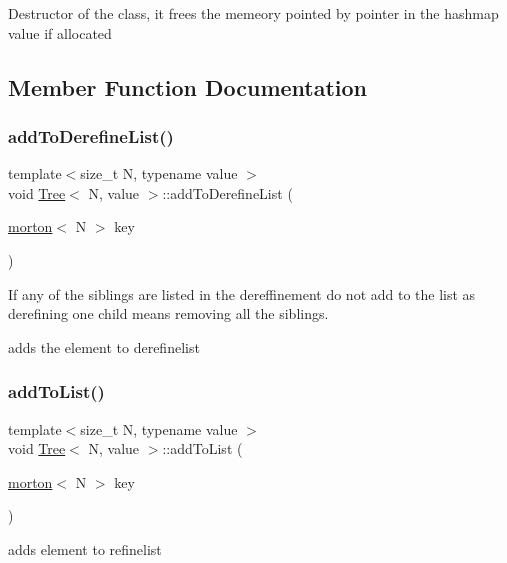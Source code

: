 Destructor of the class, it frees the memeory pointed by pointer in the hashmap value if allocated 

\subsection{Member Function Documentation}
\mbox{\label{classTree_a4527b5986587bad066e10ea733c1bc95}} 
\subsubsection{\texorpdfstring{add\+To\+Derefine\+List()}{addToDerefineList()}}
{\footnotesize\ttfamily template$<$size\+\_\+t N, typename value $>$ \\
void \mbox{\hyperlink{classTree}{Tree}}$<$ N, value $>$\+::add\+To\+Derefine\+List (\begin{DoxyParamCaption}\item[{\mbox{\hyperlink{definitions_8h_af8682350bd8bb38ee9023f7a0a310add}{morton}}$<$ N $>$}]{key }\end{DoxyParamCaption})}



If any of the siblings are listed in the dereffinement do not add to the list as derefining one child means removing all the siblings. 

adds the element to derefinelist \mbox{\label{classTree_a87d766216a59c8c77207f0fa2d093676}} 
\subsubsection{\texorpdfstring{add\+To\+List()}{addToList()}}
{\footnotesize\ttfamily template$<$size\+\_\+t N, typename value $>$ \\
void \mbox{\hyperlink{classTree}{Tree}}$<$ N, value $>$\+::add\+To\+List (\begin{DoxyParamCaption}\item[{\mbox{\hyperlink{definitions_8h_af8682350bd8bb38ee9023f7a0a310add}{morton}}$<$ N $>$}]{key }\end{DoxyParamCaption})}

adds element to refinelist \mbox{\label{classTree_aa9a32f0e006ee027c037669b8b1c7d01}} 
